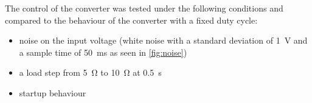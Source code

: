 The control of the converter was tested under the following conditions and compared to the behaviour of the converter with a fixed duty cycle:
\begin{itemize}
    \item noise on the input voltage (white noise with a standard deviation of \qty{1}{\volt} and a sample time of \qty{50}{\milli\second} as seen in \autoref{fig:noise})
    \item a load step from \qty{5}{\ohm} to \qty{10}{\ohm} at \qty{0.5}{\second}
    \item startup behaviour
\end{itemize}


